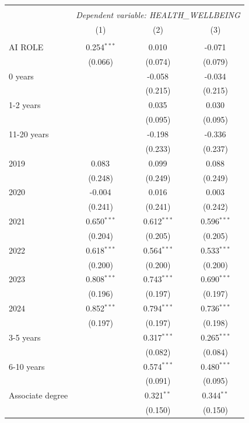 \begin{table}[!htbp] \centering
\begin{tabular}{@{\extracolsep{5pt}}lccc}
\\[-1.8ex]\hline
\hline \\[-1.8ex]
& \multicolumn{3}{c}{\textit{Dependent variable: HEALTH_WELLBEING}} \
\cr \cline{2-4}
\\[-1.8ex] & (1) & (2) & (3) \\
\hline \\[-1.8ex]
 AI ROLE & 0.254$^{***}$ & 0.010$^{}$ & -0.071$^{}$ \\
& (0.066) & (0.074) & (0.079) \\
 0 years & & -0.058$^{}$ & -0.034$^{}$ \\
& & (0.215) & (0.215) \\
 1-2 years & & 0.035$^{}$ & 0.030$^{}$ \\
& & (0.095) & (0.095) \\
 11-20 years & & -0.198$^{}$ & -0.336$^{}$ \\
& & (0.233) & (0.237) \\
 2019 & 0.083$^{}$ & 0.099$^{}$ & 0.088$^{}$ \\
& (0.248) & (0.249) & (0.249) \\
 2020 & -0.004$^{}$ & 0.016$^{}$ & 0.003$^{}$ \\
& (0.241) & (0.241) & (0.242) \\
 2021 & 0.650$^{***}$ & 0.612$^{***}$ & 0.596$^{***}$ \\
& (0.204) & (0.205) & (0.205) \\
 2022 & 0.618$^{***}$ & 0.564$^{***}$ & 0.533$^{***}$ \\
& (0.200) & (0.200) & (0.200) \\
 2023 & 0.808$^{***}$ & 0.743$^{***}$ & 0.690$^{***}$ \\
& (0.196) & (0.197) & (0.197) \\
 2024 & 0.852$^{***}$ & 0.794$^{***}$ & 0.736$^{***}$ \\
& (0.197) & (0.197) & (0.198) \\
 3-5 years & & 0.317$^{***}$ & 0.265$^{***}$ \\
& & (0.082) & (0.084) \\
 6-10 years & & 0.574$^{***}$ & 0.480$^{***}$ \\
& & (0.091) & (0.095) \\
 Associate degree & & 0.321$^{**}$ & 0.344$^{**}$ \\
& & (0.150) & (0.150) \\

\end{tabular}
\end{table}
